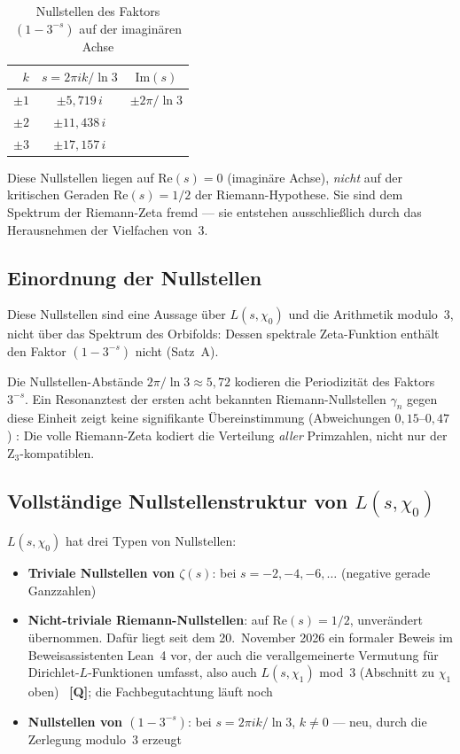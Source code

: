 \begin{table}[H]
\centering
\caption{Nullstellen des Faktors $(1-3^{-s})$ auf der imaginären Achse}
\begin{tabular}{rcc}
\toprule
$k$ & $s = 2\pi i k/\ln 3$ & $\mathrm{Im}(s)$ \\
\midrule
$\pm 1$ & $\pm 5{,}719\,i$ & $\pm 2\pi/\ln 3$ \\
$\pm 2$ & $\pm 11{,}438\,i$ & \\
$\pm 3$ & $\pm 17{,}157\,i$ & \\
\bottomrule
\end{tabular}
\end{table}

Diese Nullstellen liegen auf $\mathrm{Re}(s) = 0$ (imaginäre Achse), \emph{nicht}
auf der kritischen Geraden $\mathrm{Re}(s) = 1/2$ der Riemann-Hypothese.
Sie sind dem Spektrum der Riemann-Zeta fremd — sie entstehen ausschließlich
durch das Herausnehmen der Vielfachen von~3.

\subsection{Einordnung der Nullstellen}

Diese Nullstellen sind eine Aussage über $L(s,\chi_0)$ und die Arithmetik
modulo~3, nicht über das Spektrum des Orbifolds: Dessen spektrale
Zeta-Funktion enthält den Faktor $(1-3^{-s})$ nicht (Satz~A).

Die Nullstellen-Abstände $2\pi/\ln 3 \approx 5{,}72$ kodieren die
Periodizität des Faktors $3^{-s}$. Ein Resonanztest der ersten
acht bekannten Riemann-Nullstellen $\gamma_n$ gegen diese Einheit
zeigt keine signifikante Übereinstimmung (Abweichungen $0{,}15$--$0{,}47$) \BM:
Die volle Riemann-Zeta kodiert die Verteilung \emph{aller} Primzahlen,
nicht nur der Z$_3$-kompatiblen.

\subsection{Vollständige Nullstellenstruktur von $L(s,\chi_0)$}

$L(s,\chi_0)$ hat drei Typen von Nullstellen:
\begin{itemize}
  \item \textbf{Triviale Nullstellen von $\zeta(s)$}: bei $s = -2, -4, -6, \ldots$
        (negative gerade Ganzzahlen)
  \item \textbf{Nicht-triviale Riemann-Nullstellen}: auf $\mathrm{Re}(s) = 1/2$,
        unverändert übernommen. Dafür liegt seit dem 20.~November 2026 ein
        formaler Beweis im Beweisassistenten Lean~4 vor, der auch die
        verallgemeinerte Vermutung für Dirichlet-$L$-Funktionen umfasst, also
        auch $L(s,\chi_1)$ mod~3 (Abschnitt zu $\chi_1$ oben)~\cite{Alpoege2026} \textbf{[Q]};
        die Fachbegutachtung läuft noch
  \item \textbf{Nullstellen von $(1-3^{-s})$}: bei $s = 2\pi i k/\ln 3$, $k \neq 0$
        — neu, durch die Zerlegung modulo~3 erzeugt \BM
\end{itemize}

